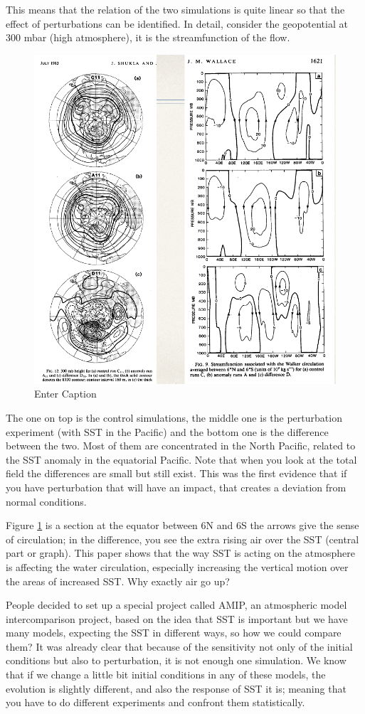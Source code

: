 This means that the relation of the two simulations is quite linear so that the effect of perturbations can be identified. In detail, consider the geopotential at 300 mbar (high atmosphere), it is the streamfunction of the flow.
\begin{figure}[htp!]
	\centering
	\includegraphics[width=0.4\linewidth]{uploads/Screenshot 2024-11-20 212453.png}
	\caption{Enter Caption}
	\label{fig:figure 1.7}
\end{figure}
The one on top is the control simulations, the middle one is the perturbation experiment (with SST in the Pacific) and the bottom one is the difference between the two.
Most of them are concentrated in the North Pacific, related to the SST anomaly in the equatorial Pacific. Note that when you look at the total field the differences are small but still exist.
This was the first evidence that if you have perturbation that will have an impact, that creates a deviation from normal conditions.

Figure \ref{fig:figure 1.7} is a section at the equator between 6N and 6S
the arrows give the sense of circulation; in the difference, you see the extra rising air over the SST (central part or graph). This paper shows that the way SST is acting on the atmosphere is affecting the water circulation, especially increasing the vertical motion over the areas of increased SST. Why exactly air go up?

People decided to set up a special project called AMIP, an atmospheric model intercomparison project, based on the idea that SST is important but we have many models, expecting the SST in different ways, so how we could compare them?
It was already clear that because of the sensitivity not only of the initial conditions but also to perturbation, it is not enough one simulation.
We know that if we change a little bit initial conditions in any of these models, the evolution is slightly different, and also the response of SST it is; meaning that you have to do different experiments and confront them statistically.

